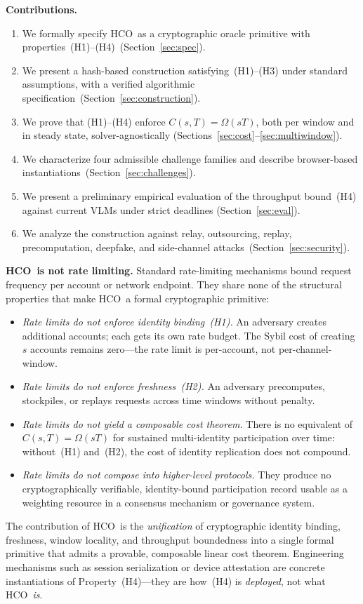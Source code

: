 \documentclass[11pt]{article}
\newcommand{\HCO}{HCO\xspace}
\theoremstyle{remark}
\theoremstyle{plain}
\begin{document}
	\noindent\textbf{Contributions.}
	\begin{enumerate}
		\item We formally specify \HCO\ as a cryptographic oracle
		primitive with properties~(H1)--(H4)~(Section~\ref{sec:spec}).
		\item We present a hash-based construction satisfying~(H1)--(H3)
		under standard assumptions, with a verified algorithmic
		specification~(Section~\ref{sec:construction}).
		\item We prove that (H1)--(H4) enforce $C(s,T) = \Omega(sT)$,
		both per window and in steady state, solver-agnostically
		(Sections~\ref{sec:cost}--\ref{sec:multiwindow}).
		\item We characterize four admissible challenge families and
		describe browser-based instantiations~(Section~\ref{sec:challenges}).
		\item We present a preliminary empirical evaluation of the throughput
		bound~(H4) against current VLMs under strict deadlines
		(Section~\ref{sec:eval}).
		\item We analyze the construction against relay, outsourcing,
		replay, precomputation, deepfake, and side-channel
		attacks~(Section~\ref{sec:security}).
	\end{enumerate}
	
	\noindent\textbf{\HCO\ is not rate limiting.}
	Standard rate-limiting mechanisms bound request frequency per account
	or network endpoint. They share none of the structural properties that
	make \HCO\ a formal cryptographic primitive:
	\begin{itemize}
		\item \emph{Rate limits do not enforce identity binding~(H1).}
		An adversary creates additional accounts; each gets its own rate
		budget. The Sybil cost of creating $s$ accounts remains
		zero---the rate limit is per-account, not per-channel-window.
		\item \emph{Rate limits do not enforce freshness~(H2).}
		An adversary precomputes, stockpiles, or replays requests across
		time windows without penalty.
		\item \emph{Rate limits do not yield a composable cost theorem.}
		There is no equivalent of $C(s,T) = \Omega(sT)$ for sustained
		multi-identity participation over time: without~(H1) and~(H2),
		the cost of identity replication does not compound.
		\item \emph{Rate limits do not compose into higher-level protocols.}
		They produce no cryptographically verifiable, identity-bound
		participation record usable as a weighting resource in a consensus
		mechanism or governance system.
	\end{itemize}
	The contribution of \HCO\ is the \emph{unification} of
	cryptographic identity binding, freshness, window locality, and
	throughput boundedness into a single formal primitive that admits a
	provable, composable linear cost theorem. Engineering mechanisms
	such as session serialization or device attestation are concrete
	instantiations of Property~(H4)---they are how~(H4) is
	\emph{deployed}, not what \HCO\ \emph{is}.
	
\end{document}
